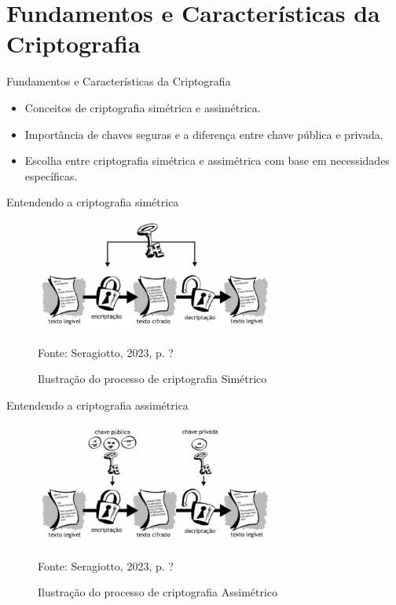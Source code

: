 \documentclass[brazil]{beamer}
\begin{document}
\section{Fundamentos e Características da Criptografia}
\begin{frame}
	\tableofcontents[currentsection]
\end{frame}
\begin{frame}{Fundamentos e Características da Criptografia}
	\justifying
	\begin{itemize}[label={$\bullet$}]
		\item Conceitos de criptografia simétrica e assimétrica.
		\item Importância de chaves seguras e a diferença entre chave pública e privada.
		\item Escolha entre criptografia simétrica e assimétrica com base em necessidades específicas.
	\end{itemize}
\end{frame}
\begin{frame}{Entendendo a criptografia simétrica}
	\begin{figure}[h!] \centering
		\includegraphics[width=0.7\textwidth]{../Imagens/ilustracao_do_processo_de_criptografia_simetrico}
		\caption{Ilustração do processo de criptografia Simétrico}
		Fonte: Seragiotto, 2023, p. ?
	\end{figure}
\end{frame}
\begin{frame}{Entendendo a criptografia assimétrica}
	\begin{figure}[h!] \centering
		\includegraphics[width=0.7\textwidth]{../Imagens/ilustracao_do_processo_de_criptografia_assimetrico}
		\caption{Ilustração do processo de criptografia Assimétrico}
		Fonte: Seragiotto, 2023, p. ?
	\end{figure}
\end{frame}
\end{document}
